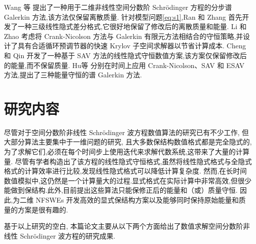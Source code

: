 Wang 等 \cite{wangSplitstepSpectralGalerkin2019} 提出了一种用于二维非线性空间分数阶 Schr{\"o}dinger 方程的分步谱 Galerkin 方法,该方法仅保留离散质量.
针对模型问题\eqref{eq:s1},Ran 和 Zhang \cite{ranLinearlyImplicitConservative2016} 首先开发了一种三级线性隐式差分格式,它很好地保留了修改后的离散质量和能量. 
Li 和 Zhao \cite{liFastEnergyConserving2018} 考虑将 Crank-Nicolson 方法与 Galerkin 有限元方法相结合的守恒策略,并设计了具有合适循环预调节器的快速 Krylov 子空间求解器以节省计算成本. 
Cheng 和 Qin \cite{chengConvergenceEnergyconservingScheme2022} 开发了一种基于 SAV 方法的线性隐式守恒数值方案,该方案仅保留修改后的能量,而不保留质量.
Hu等 \cite{huEfficientEnergyPreserving2022} 分别在时间上应用 Crank-Nicolson、SAV 和 ESAV 方法,提出了三种能量守恒的谱 Galerkin 方法.

\section{研究内容}
尽管对于空间分数阶非线性 Schr{\"o}dinger 波方程数值算法的研究已有不少工作, 但大部分算法主要集中于一维问题的研究, 且大多数保结构数值格式都是完全隐式的,为了求解它们,必须在每个时间步上使用迭代来求解代数系统,这带来了大量的计算量.
尽管有学者构造出了该方程的线性隐式守恒格式,虽然将线性隐式格式与全隐式格式的计算效率进行比较,发现线性隐式格式可以降低计算复杂度.
然而,在长时间数值模拟中,这仍然是一个计算量大的过程.显式格式在实际计算中非常高效,但很少能做到保结构.此外,目前提出这些算法只能保修正后的能量和（或）质量守恒.
因此,为二维 NFSWEs 开发高效的显式保结构方案以及能够同时保持原始能量和质量的方案是很有趣的.

基于以上研究的空白, 本篇论文主要从以下两个方面给出了数值求解空间分数阶非线性 Schr{\"o}dinger 波方程的研究成果.

